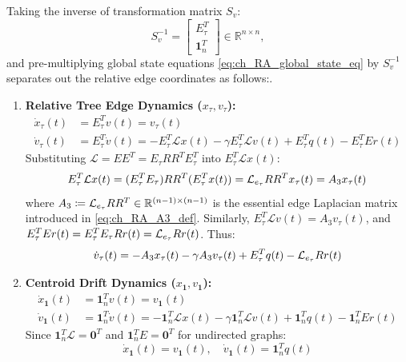 Taking the inverse of transformation matrix $S_v$:
\begin{equation}\label{eq:ch_RA_Sv_inverse}
	S_v^{-1} = \begin{bmatrix} E_\tau^T \\ \mathbf{1}_n^T \end{bmatrix} \in \mathbb{R}^{n \times n},
\end{equation}
and pre-multiplying global state equations \eqref{eq:ch_RA_global_state_eq} by $S_v^{-1}$ separates out the relative edge coordinates as follows:.

\begin{enumerate}
	\item \textbf{Relative Tree Edge Dynamics ($x_\tau, v_\tau$):}
	\begin{align}\label{eq:ch_RA_edge_dynamics_raw}
		\dot{x}_\tau(t) &= E_\tau^T v(t) = v_\tau(t) \nonumber \\
		\dot{v}_\tau(t) &= E_\tau^T \dot{v}(t) = -E_\tau^T \mathcal{L} x(t) - \gamma E_\tau^T \mathcal{L} v(t) + E_\tau^T q(t) - E_\tau^T E r(t)
	\end{align}
	Substituting $\mathcal{L} = E E^T = E_\tau R R^T E_\tau^T$ into $E_\tau^T \mathcal{L} x(t)$:
	\begin{equation}
		E_\tau^T \mathcal{L} x(t) = (E_\tau^T E_\tau) R R^T (E_\tau^T x(t)) = \mathcal{L}_{e_{\tau}} R R^T x_\tau(t) = A_3 x_\tau(t)
	\end{equation}
	where $A_3 \coloneqq \mathcal{L}_{e_{\tau}} R R^T \in \mathbb{R}^{(n-1) \times (n-1)}$ is the essential edge Laplacian matrix introduced in \eqref{eq:ch_RA_A3_def}. Similarly, $E_\tau^T \mathcal{L} v(t) = A_3 v_\tau(t)$, and $E_\tau^T E r(t) = E_\tau^T E_\tau R r(t) = \mathcal{L}_{e_{\tau}} R r(t)$. Thus:
	\begin{equation}\label{eq:ch_RA_v_tau_dot}
		\dot{v}_\tau(t) = -A_3 x_\tau(t) - \gamma A_3 v_\tau(t) + E_\tau^T q(t) - \mathcal{L}_{e_{\tau}} R r(t)
	\end{equation}

	\item \textbf{Centroid Drift Dynamics ($x_\mathbf{1}, v_\mathbf{1}$):}
	\begin{align}\label{eq:ch_RA_centroid_dynamics}
		\dot{x}_\mathbf{1}(t) &= \mathbf{1}_n^T v(t) = v_\mathbf{1}(t) \nonumber \\
		\dot{v}_\mathbf{1}(t) &= \mathbf{1}_n^T \dot{v}(t) = -\mathbf{1}_n^T \mathcal{L} x(t) - \gamma \mathbf{1}_n^T \mathcal{L} v(t) + \mathbf{1}_n^T q(t) - \mathbf{1}_n^T E r(t)
	\end{align}
	Since $\mathbf{1}_n^T \mathcal{L} = \mathbf{0}^T$ and $\mathbf{1}_n^T E = \mathbf{0}^T$ for undirected graphs:
	\begin{equation}\label{centroid}
		\dot{x}_\mathbf{1}(t) = v_\mathbf{1}(t), \quad \dot{v}_\mathbf{1}(t) = \mathbf{1}_n^T q(t)
	\end{equation}
\end{enumerate}


